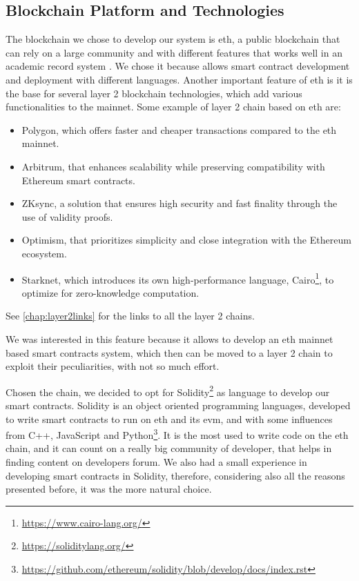 \subsection{Blockchain Platform and Technologies}
The blockchain we chose to develop our system is \acrlong{eth}, a public blockchain that can rely on a large community and with different features that works well in an academic record system \cite{mustafa2024publiceduchain}\cite{yassynzhanbolatzhan2021verificationuniversitystudent}. We chose it because allows smart contract development and deployment with different languages. Another important feature of \acrlong{eth} is it is the base for several layer 2 blockchain technologies, which add various functionalities to the mainnet. Some example of layer 2 chain based on \acrlong{eth} are:

\begin{itemize}
    \item Polygon, which offers faster and cheaper transactions compared to the \acrlong{eth} mainnet.
    \item Arbitrum, that enhances scalability while preserving compatibility with Ethereum smart contracts.
    \item ZKsync, a solution that ensures high security and fast finality through the use of validity proofs.
    \item Optimism, that prioritizes simplicity and close integration with the Ethereum ecosystem.
    \item Starknet, which introduces its own high-performance language, Cairo\footnote{\url{https://www.cairo-lang.org/}}, to optimize for zero-knowledge computation.
\end{itemize}
See \cref{chap:layer2links} for the links to all the layer 2 chains.

We was interested in this feature because it allows to develop an \acrlong{eth} mainnet based smart contracts system, which then can be moved to a layer 2 chain to exploit their peculiarities, with not so much effort.

Chosen the chain, we decided to opt for Solidity\footnote{\url{https://soliditylang.org/}} as language to develop our smart contracts. Solidity is an object oriented programming languages, developed to write smart contracts to run on \acrlong{eth} and its \acrshort{evm}, and with some influences from C++, JavaScript and Python\footnote{\url{https://github.com/ethereum/solidity/blob/develop/docs/index.rst}}. It is the most used to write code on the \acrlong{eth} chain, and it can count on a really big community of developer, that helps in finding content on developers forum. We also had a small experience in developing smart contracts in Solidity, therefore, considering also all the reasons presented before, it was the more natural choice.

